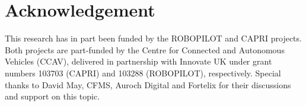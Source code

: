 \documentclass[runningheads,twocolumn,a4paper,10pt]{llncs}
\begin{document}
\section*{Acknowledgement}
This research has in part been funded by the ROBOPILOT and CAPRI projects. Both projects are part-funded by the Centre for Connected and Autonomous Vehicles (CCAV), delivered in partnership with Innovate UK under grant numbers 103703 (CAPRI) and 103288 (ROBOPILOT), respectively. Special thanks to David May, CFMS, Auroch Digital and Fortelix for their discussions and support on this topic.  
%
\balance

\printbibliography
\end{document}
